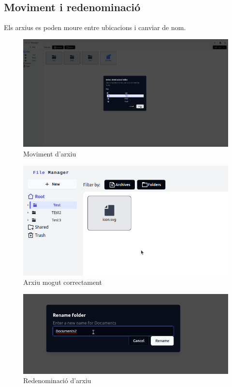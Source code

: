 \subsection{Moviment i redenominació}

Els arxius es poden moure entre ubicacions i canviar de nom.

\begin{figure}[H]
\centering
\includegraphics[width=0.7\linewidth]{Figures/implementacio/moveFile.png}
\caption{Moviment d'arxiu}
\label{fig:moveFile}
\end{figure}

\begin{figure}[H]
\centering
\includegraphics[width=0.7\linewidth]{Figures/implementacio/moveFileSuccess.png}
\caption{Arxiu mogut correctament}
\label{fig:moveFileSuccess}
\end{figure}

\begin{figure}[H]
\centering
\includegraphics[width=0.7\linewidth]{Figures/implementacio/renameFile.png}
\caption{Redenominació d'arxiu}
\label{fig:renameFile}
\end{figure}

